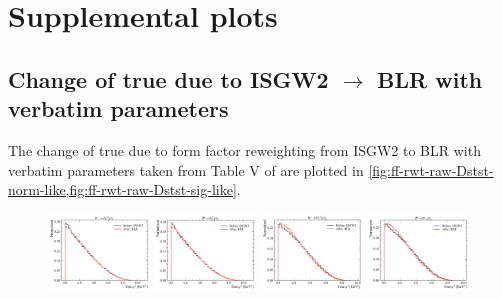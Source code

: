 \chapter{Supplemental plots}

\section{Change of true \qSq due to ISGW2 $\rightarrow$ BLR with verbatim
parameters}
\label{appx:suppl:dstst-ff-verbatim}

The change of true \qSq due to form factor reweighting from ISGW2 to
BLR with verbatim parameters taken from Table V of \cite{Bernlochner_2018}
are plotted in
\cref{fig:ff-rwt-raw-Dstst-norm-like,fig:ff-rwt-raw-Dstst-sig-like}.

\begin{figure}[ht]
    \centering
    \includegraphics[width=0.24\textwidth]{
        ./figs-supplemental-plots/Dstst-form-factors/DststMu/D0stst0Mu.pdf
    }
    \includegraphics[width=0.24\textwidth]{
        ./figs-supplemental-plots/Dstst-form-factors/DststMu/D0ststMu.pdf
    }
    \includegraphics[width=0.24\textwidth]{
        ./figs-supplemental-plots/Dstst-form-factors/DststMu/D1pstst0Mu.pdf
    }
    \includegraphics[width=0.24\textwidth]{
        ./figs-supplemental-plots/Dstst-form-factors/DststMu/D1pststMu.pdf
    }


\end{figure}
